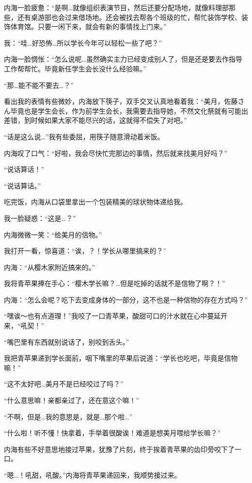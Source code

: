 内海一脸疲惫：“是啊…就像组织表演节目，然后还要分配场地，就像料理部那些，还有桌游部也会过来借场地。还会被找去帮各个班级的忙，帮忙装饰学校、装饰体育馆。只要一闲下来，就会有新的事情找上门来。”

我：“哇…好恐怖…所以学长今年可以轻松一些了吧？”

内海一脸惆怅：“怎么说呢…虽然确实主力已经变成别人了，但是还是要去作指导工作帮帮忙。毕竟新任学生会长没什么经验嘛。”

“那…能不能不要去…？”

看出我的表情有些微妙，内海放下筷子，双手交叉认真地看着我：“美月，佐藤さん毕竟也是学生会长，作为前学生会长，我需要去指导她，不然文化祭就有可能出差错，到时候如果大家不能尽兴的话，这就得不偿失了对吧。”

“话是这么说…”我有些委屈，用筷子随意滑动着米饭。

内海叹了口气：“好啦，我会尽快忙完那边的事情，然后就来找美月好吗？”

“说话算话！”

“说话算话。”

吃完饭，内海从口袋里拿出一个包装精美的球状物体递给我。

我一脸疑惑：“这是…？”

内海微微一笑：“给美月的信物。”

我打开一看，惊喜道：“诶，？！学长从哪里搞来的？”

内海：“从樱木家附近搞来的。”

我将青苹果捧在手心：“樱木学长嘛？…但是吃掉的话就不是信物了啊？！”

内海：“怎么会呢？吃下去变成身体的一部分，这不也是一种信物的存在方式吗？”

“嘿诶～也有点道理！”我咬了一口青苹果，酸甜可口的汁水就在心中蔓延开来，“吼契！”

“嘴巴里有东西就别说话了，别咬到舌头。”

我把青苹果递到学长面前，咽下嘴里的苹果后说道：“学长也吃吧，毕竟是信物嘛！”

“这不太好吧…美月不是已经咬过了吗？”

“什么意思嘛！亲都亲过了，还在意这个嘛！”

“不啊，但是…我的意思是，就是…那个啦…”

“什么啦！听不懂！快拿着，手举着很酸诶！难道是想美月喂给学长嘛？”

内海有些不好意思地接过苹果，犹豫了片刻，终于挨着青苹果的齿印旁咬下了一口。

“嗯…！吼甜，吼酸。”内海将青苹果递回来，我顺势接过来。

